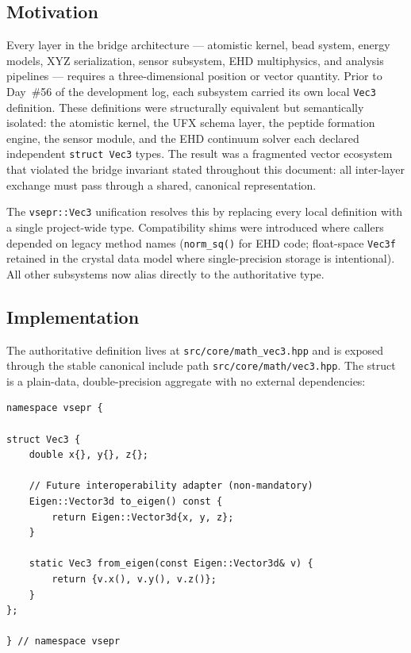 ﻿\documentclass[11pt]{article}
\newcommand{\file}[1]{\texttt{#1}}
\newcommand{\type}[1]{\texttt{#1}}
\begin{document}
\subsection{Motivation}

Every layer in the bridge architecture --- atomistic kernel, bead system,
energy models, XYZ serialization, sensor subsystem, EHD multiphysics, and
analysis pipelines --- requires a three-dimensional position or vector
quantity. Prior to Day~\#56 of the development log, each subsystem carried
its own local \type{Vec3} definition. These definitions were structurally
equivalent but semantically isolated: the atomistic kernel, the UFX schema
layer, the peptide formation engine, the sensor module, and the EHD continuum
solver each declared independent \texttt{struct Vec3} types. The result was a
fragmented vector ecosystem that violated the bridge invariant stated
throughout this document: all inter-layer exchange must pass through a shared,
canonical representation.

The \type{vsepr::Vec3} unification resolves this by replacing every local
definition with a single project-wide type. Compatibility shims were
introduced where callers depended on legacy method names (\texttt{norm\_sq()}
for EHD code; float-space \type{Vec3f} retained in the crystal data model
where single-precision storage is intentional). All other subsystems now
alias directly to the authoritative type.

\subsection{Implementation}

The authoritative definition lives at
\file{src/core/math\_vec3.hpp} and is exposed through the stable canonical
include path \file{src/core/math/vec3.hpp}. The struct is a
plain-data, double-precision aggregate with no external dependencies:

\begin{lstlisting}
namespace vsepr {

struct Vec3 {
    double x{}, y{}, z{};

    // Future interoperability adapter (non-mandatory)
    Eigen::Vector3d to_eigen() const {
        return Eigen::Vector3d{x, y, z};
    }

    static Vec3 from_eigen(const Eigen::Vector3d& v) {
        return {v.x(), v.y(), v.z()};
    }
};

} // namespace vsepr
\end{lstlisting}
\end{document}
